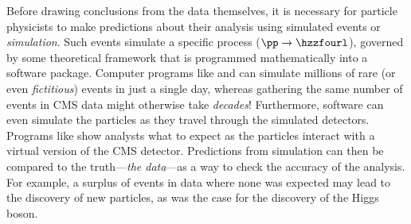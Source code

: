 Before drawing conclusions from the data themselves, it is necessary for particle physicists to make predictions about their analysis using simulated events or \emph{simulation}.
Such events simulate a specific process (\eg $\pp \to \hzzfourl$), governed by some theoretical framework that is programmed mathematically into a software package.
Computer programs like \MGvATNLO and \POWHEG can simulate millions of rare (or even \emph{fictitious}) events in just a single day, whereas gathering the same number of events in CMS data might otherwise take \emph{decades}!
Furthermore, software can even simulate the particles as they travel through the simulated detectors.
Programs like \GEANTfour show analysts what to expect as the particles interact with a virtual version of the CMS detector.
Predictions from simulation can then be compared to the truth---\emph{the data}---as a way to check the accuracy of the analysis.
For example, a surplus of events in data where none was expected may lead to the discovery of new particles, as was the case for the discovery of the Higgs boson.

